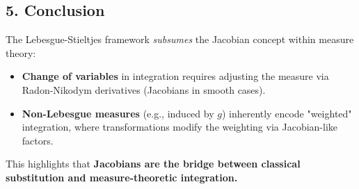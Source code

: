 \documentclass[12pt]{article}
\begin{document}
\subsection*{5. Conclusion}
The Lebesgue-Stieltjes framework \textit{subsumes} the Jacobian concept within measure theory:
\begin{itemize}
    \item \textbf{Change of variables} in integration requires adjusting the measure via Radon-Nikodym derivatives (Jacobians in smooth cases).
    \item \textbf{Non-Lebesgue measures} (e.g., induced by \( g \)) inherently encode "weighted" integration, where transformations modify the weighting via Jacobian-like factors.
\end{itemize}

This highlights that \textbf{Jacobians are the bridge between classical substitution and measure-theoretic integration.}
\end{document}
